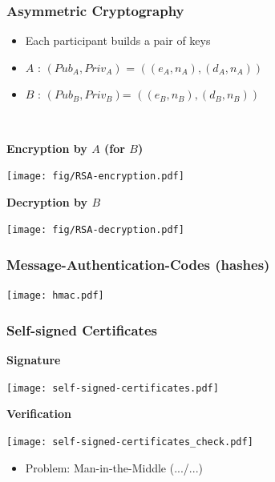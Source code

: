 \documentclass[
hyperref={pdfpagelabels=false}
,xcolor=table
]
{beamer}
\begin{document}
\begin{frame}
  \frametitle{Asymmetric Cryptography}

  \begin{itemize}
  \item Each participant builds a pair of keys
  \item $A$ : $(Pub_A, Priv_A)$ = $((e_A,n_A), (d_A, n_A))$
  \item $B$ : $(Pub_B, Priv_B)$= $((e_B,n_B), (d_B, n_B))$
  \end{itemize}

  \
  
  \textbf{Encryption by $A$ (for $B$)}
  
  \begin{center}
    \texttt{[image: fig/RSA-encryption.pdf]}
  \end{center}
  
  \vfill
  
  
  \textbf{Decryption by $B$}
  
   \begin{center}
     \texttt{[image: fig/RSA-decryption.pdf]}
   \end{center}
\end{frame}


\begin{frame}
  \frametitle{Message-Authentication-Codes (hashes)}

  \begin{center}
    \texttt{[image: hmac.pdf]}
  \end{center}
\end{frame}


\begin{frame}
  \frametitle{Self-signed Certificates}

  \begin{minipage}[t]{.45\linewidth}
    \textbf{Signature}

    \bigskip
    
    
    \texttt{[image: self-signed-certificates.pdf]}        
  \end{minipage}
  \hfill
  \begin{minipage}[t]{.45\linewidth}
    \textbf{Verification}

    \bigskip
    
    \texttt{[image: self-signed-certificates\_check.pdf]}    
  \end{minipage}

  \vfill

  
  \begin{itemize}
  \item Problem: Man-in-the-Middle (.../...)
  \end{itemize}
  
\end{frame}
\end{document}
